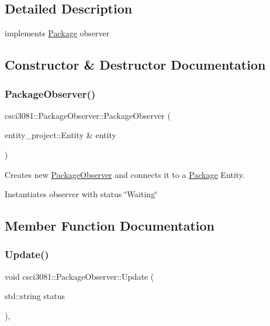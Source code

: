 \subsection{Detailed Description}
implements \hyperlink{classcsci3081_1_1Package}{Package} observer 

\subsection{Constructor \& Destructor Documentation}
\mbox{\label{classcsci3081_1_1PackageObserver_a053e974efd7433e5b92012e68b1aee42}} 
\subsubsection{\texorpdfstring{Package\+Observer()}{PackageObserver()}}
{\footnotesize\ttfamily csci3081\+::\+Package\+Observer\+::\+Package\+Observer (\begin{DoxyParamCaption}\item[{entity\+\_\+project\+::\+Entity \&}]{entity }\end{DoxyParamCaption})\hspace{0.3cm}{\ttfamily [inline]}}



Creates new \hyperlink{classcsci3081_1_1PackageObserver}{Package\+Observer} and connects it to a \hyperlink{classcsci3081_1_1Package}{Package} Entity. 

Instantiates observer with status \char`\"{}\+Waiting\char`\"{} 

\subsection{Member Function Documentation}
\mbox{\label{classcsci3081_1_1PackageObserver_a8ebc5b23b82ee2a2d0ec13872f24fb6c}} 
\subsubsection{\texorpdfstring{Update()}{Update()}}
{\footnotesize\ttfamily void csci3081\+::\+Package\+Observer\+::\+Update (\begin{DoxyParamCaption}\item[{std\+::string}]{status }\end{DoxyParamCaption})\hspace{0.3cm}{\ttfamily [inline]}, {\ttfamily [virtual]}}



